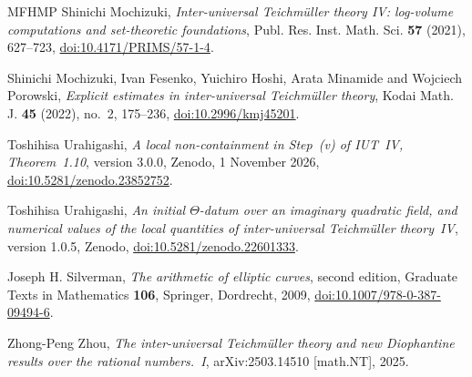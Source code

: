 \documentclass[11pt,a4paper]{article}
\theoremstyle{plain}
\theoremstyle{definition}
\begin{document}
\begin{thebibliography}{MFHMP}
Shinichi Mochizuki, \emph{Inter-universal {T}eichm\"uller theory {IV}: log-volume computations and set-theoretic
foundations}, Publ. Res. Inst. Math. Sci. \textbf{57} (2021), 627--723, \href{https://doi.org/10.4171/PRIMS/57-1-4}{doi:10.4171/PRIMS/57-1-4}.

Shinichi Mochizuki, Ivan Fesenko, Yuichiro Hoshi, Arata Minamide and Wojciech Porowski, \emph{Explicit estimates in
inter-universal {T}eichm\"uller theory}, Kodai Math. J. \textbf{45} (2022), no.~2, 175--236, \href{https://doi.org/10.2996/kmj45201}{doi:10.2996/kmj45201}.

Toshihisa Urahigashi, \emph{A local non-containment in Step~(v) of {IUT}~{IV}, {T}heorem~1.10}, version 3.0.0, Zenodo,
1 November 2026, \href{https://doi.org/10.5281/zenodo.23852752}{doi:10.5281/zenodo.23852752}.

Toshihisa Urahigashi, \emph{An initial $\Theta$-datum over an imaginary quadratic field, and numerical values of the
local quantities of inter-universal {T}eichm\"uller theory~{IV}}, version 1.0.5, Zenodo,
\href{https://doi.org/10.5281/zenodo.22601333}{doi:10.5281/zenodo.22601333}.

Joseph H. Silverman, \emph{The arithmetic of elliptic curves}, second edition, Graduate Texts in Mathematics
\textbf{106}, Springer, Dordrecht, 2009, \href{https://doi.org/10.1007/978-0-387-09494-6}{doi:10.1007/978-0-387-09494-6}.

Zhong-Peng Zhou, \emph{The inter-universal {T}eichm\"uller theory and new {D}iophantine results over the rational
numbers.~{I}}, arXiv:2503.14510 [math.NT], 2025.
\end{thebibliography}
\end{document}
